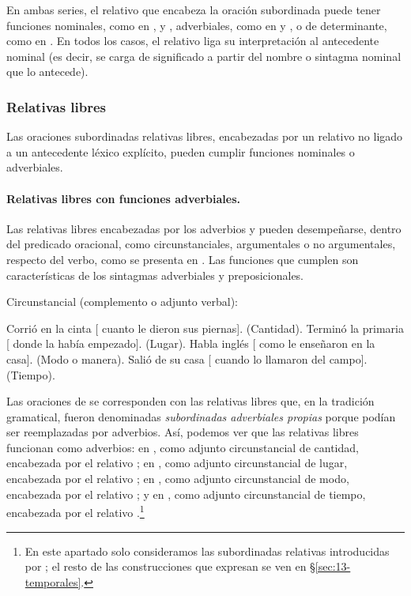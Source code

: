 En ambas series, el relativo que encabeza la oración subordinada puede tener
funciones nominales, como en ,  y
, adverbiales, como en  y
, o de determinante, como en . En todos los
casos, el relativo liga su interpretación al antecedente nominal (es decir, se
carga de significado a partir del nombre o sintagma nominal que lo antecede).

\subsubsection{Relativas libres}\label{sec:13-libres}

Las oraciones subordinadas relativas libres, encabezadas por un relativo no
ligado a un antecedente léxico explícito, pueden cumplir funciones nominales o
adverbiales.

\paragraph{Relativas libres con funciones adverbiales.}\label{sec:13-libres-adv}
Las relativas libres encabezadas por los adverbios 
y  pueden desempeñarse, dentro del predicado oracional, como
circunstanciales, argumentales o no argumentales, respecto del verbo, como se
presenta en . Las funciones que cumplen son características de
los sintagmas adverbiales y preposicionales.

\begin{exe}
  \ex\label{ex:13-circ} Circunstancial (complemento o adjunto verbal):
    \begin{xlist}
      \ex\label{ex:13-circ-a} Corrió en la cinta [ cuanto le dieron
          sus piernas]. (Cantidad).
      \ex\label{ex:13-circ-b} Terminó la primaria [ donde la había
          empezado]. (Lugar).
      \ex\label{ex:13-circ-c} Habla inglés [ como le enseñaron en la
          casa]. (Modo o manera).
      \ex\label{ex:13-circ-d} Salió de su casa [ cuando lo llamaron del
          campo]. (Tiempo).
    \end{xlist}
\end{exe}

Las oraciones de  se corresponden con las relativas libres que,
en la tradición gramatical, fueron denominadas \textit{subordinadas adverbiales
propias} porque podían ser reemplazadas por adverbios. Así, podemos ver que las
relativas libres funcionan como adverbios: en , como adjunto
circunstancial de cantidad, encabezada por el relativo ; en
, como adjunto circunstancial de lugar, encabezada por el
relativo ; en , como adjunto circunstancial de
modo, encabezada por el relativo ; y en , como
adjunto circunstancial de tiempo, encabezada por el relativo
.\footnote{En este apartado solo consideramos las subordinadas
relativas introducidas por ; el resto de las construcciones que
expresan  se ven en §\ref{sec:13-temporales}.}

